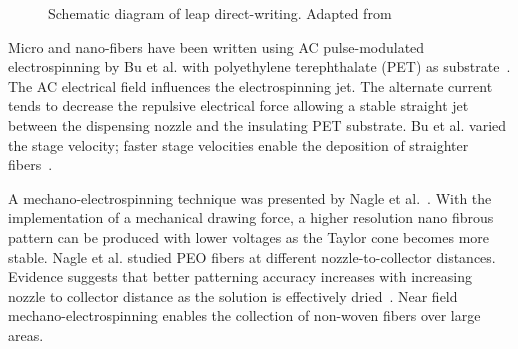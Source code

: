 \bgroup
\begin{figure}[!htbp]
\centering \makeatletter{}
\makeatother 
\caption[Schematic diagram of leap direct-writing]{Schematic diagram of leap direct-writing. Adapted from \cite{527120:11974311}}
\label{f-7587d8081ccc}
\end{figure}

\egroup
Micro and nano-fibers have been written using AC pulse-modulated electrospinning by Bu et al. with polyethylene terephthalate (PET) as substrate\unskip~\cite{527120:11974304}. The AC electrical field influences the electrospinning jet. The alternate current tends to decrease the repulsive electrical force allowing a stable straight jet between the dispensing nozzle and the insulating PET substrate. Bu et al. varied the stage velocity; faster stage velocities enable the deposition of straighter fibers\unskip~\cite{527120:11974304}.

 A mechano-electrospinning technique was presented by Nagle et al.\unskip~\cite{527120:12033656}. With the implementation of a mechanical drawing force, a higher resolution nano fibrous pattern can be produced with lower voltages as the Taylor cone becomes more stable. Nagle et al. studied PEO fibers at different nozzle-to-collector distances. Evidence suggests that better patterning accuracy increases with increasing nozzle to collector distance as the solution is effectively dried\unskip~\cite{527120:12033656}. Near field mechano-electrospinning enables the collection of non-woven fibers over large areas.


